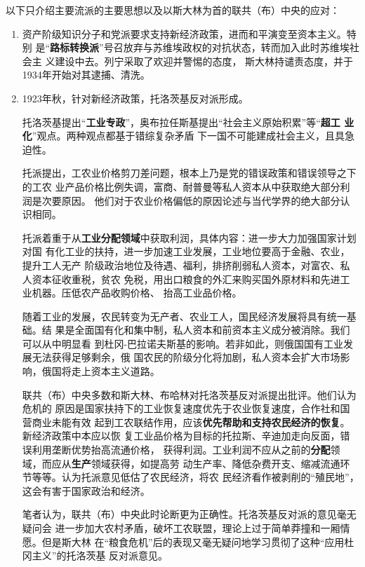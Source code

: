 以下只介绍主要流派的主要思想以及以斯大林为首的联共（布）中央的应对：
\begin{enumerate}
\item 资产阶级知识分子和党派要求支持新经济政策，进而和平演变至资本主义。特别
  是“\textbf{路标转换派}”号召放弃与苏维埃政权的对抗状态，转而加入此时苏维埃社会主
  义建设中去。列宁采取了欢迎并警惕的态度，
  斯大林持谴责态度，并于1934年开始对其逮捕、清洗。\cite{wenyilubiao}

\item 1923年秋，针对新经济政策，托洛茨基反对派形成。

  托洛茨基提出“\textbf{工业专政}”，奥布拉任斯基提出“社会主义原始积累”等“\textbf{超工
    业化}”观点。两种观点都基于错综复杂矛盾
  下一国不可能建成社会主义，且具急迫性。

  托派提出，工农业价格剪刀差问题，根本上乃是党的错误政策和错误领导之下的工农
  业产品价格比例失调，富商、耐普曼等私人资本从中获取绝大部分利润是次要原因。
  他们对于农业价格偏低的原因论述与当代学界的绝大部分认识相同。

  托派着重于从\textbf{工业分配领域}中获取利润，具体内容：进一步大力加强国家计划对国
  有化工业的扶持，进一步加速工业发展，工业地位要高于金融、农业，提升工人无产
  阶级政治地位及待遇、福利，排挤削弱私人资本，对富农、私人资本征收重税，贫农
  免税，用出口粮食的外汇来购买国外原材料和先进工业机器。压低农产品收购价格、
  抬高工业品价格。

  随着工业的发展，农民转变为无产者、农业工人，国民经济发展将具有统一基础。结
  果是全面国有化和集中制，私人资本和前资本主义成分被消除。我们可以从中明显看
  到杜冈-巴拉诺夫斯基的影响。若非如此，则俄国国有工业发展无法获得足够剩余，俄
  国农民的阶级分化将加剧，私人资本会扩大市场影响，俄国将走上资本主义道路。

  联共（布）中央多数和斯大林、布哈林对托洛茨基反对派提出批评。他们认为危机的
  原因是国家扶持下的工业恢复速度优先于农业恢复速度，合作社和国营商业未能有效
  起到工农联结作用，应该\textbf{优先帮助和支持农民经济的恢复}。新经济政策中本应以恢
  复工业品价格为目标的托拉斯、辛迪加走向反面，错误利用垄断优势抬高流通价格，
  获得利润。工业利润不应从之前的\textbf{分配}领域，而应从\textbf{生产}领域获得，如提高劳
  动生产率、降低杂费开支、缩减流通环节等等。认为托派意见低估了农民经济，将农
  民经济看作被剥削的“殖民地”，这会有害于国家政治和经济。

  笔者认为，联共（布）中央此时论断更为正确性。托洛茨基反对派的意见毫无疑问会
  进一步加大农村矛盾，破坏工农联盟，理论上过于简单莽撞和一厢情愿。但是斯大林
  在“粮食危机”后的表现又毫无疑问地学习贯彻了这种“应用杜冈主义”的托洛茨基
  反对派意见。


\end{enumerate}
